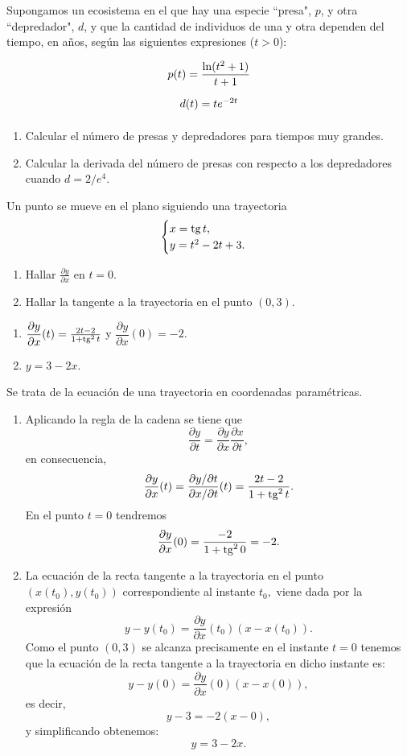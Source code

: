 {Supongamos un ecosistema en el que hay una especie ``presa", $p$, y otra ``depredador", $d$, y que la cantidad de individuos de una y otra dependen del tiempo, en años, según las siguientes expresiones ($t>0$):
\[
\renewcommand{\arraystretch}{2.2}
\begin{array}{*{20}c}
   {p(t) = \dfrac{{\ln (t^2  + 1)}}{{t + 1}}}  \\
   {d(t) = te^{ - 2t} }  \\
\end{array}
\]
\begin{enumerate}
\item Calcular el número de presas y depredadores para tiempos muy grandes.
\item Calcular la derivada del número de presas con respecto a los depredadores cuando $d=2/e^4$.
\end{enumerate}
}


{Un punto se mueve en el plano siguiendo una trayectoria 
\[
\begin{cases}
x = \operatorname{tg} t,  \\ 
y = t^2-2t+3. \\
\end{cases}
\]

\begin{enumerate}
\item  Hallar $\frac{\partial y}{\partial x}$ en $t=0$.
\item  Hallar la tangente a la trayectoria en el punto $(0,3)$.
\end{enumerate}
}
{\begin{enumerate}
\item $\dfrac{\partial y}{\partial x}(t) = \frac{2t-2}{1+\operatorname{tg}^2t}$ y $\dfrac{\partial y}{\partial x}(0) = -2$.
\item $y = 3-2x$.
\end{enumerate}
}
{Se trata de la ecuación de una trayectoria en coordenadas paramétricas.
\begin{enumerate}
\item  Aplicando la regla de la cadena se tiene que 
\[
\dfrac{\partial y}{\partial t} = \dfrac{\partial y}{\partial x}\dfrac{\partial x}{\partial t},
\] 
en consecuencia,
\[
\dfrac{\partial y}{\partial x}(t) = \frac{\partial y/\partial t}{\partial x/\partial t}(t)=\frac{2t-2}{1+\operatorname{tg}^2t}.
\]
En el punto $t=0$ tendremos
\[
\dfrac{\partial y}{\partial x}(0) = \frac{-2}{1+\operatorname{tg}^20} = -2.
\]

\item  La ecuación de la recta tangente a la trayectoria en el punto $(x(t_0),y(t_0))$ correspondiente al instante $t_0,$ viene dada por la expresión
\[
y-y(t_0) = \dfrac{\partial y}{\partial x}(t_0)(x-x(t_0)).
\]
Como el punto $(0,3)$ se alcanza precisamente en el instante $t=0$ tenemos que la ecuación de la recta tangente a la trayectoria en dicho instante es:
\[
y-y(0) = \dfrac{\partial y}{\partial x}(0)(x-x(0)),
\]
es decir,
\[
y-3 = -2(x-0),
\]
y simplificando obtenemos:
\[
y = 3-2x.
\]
\end{enumerate}
}



